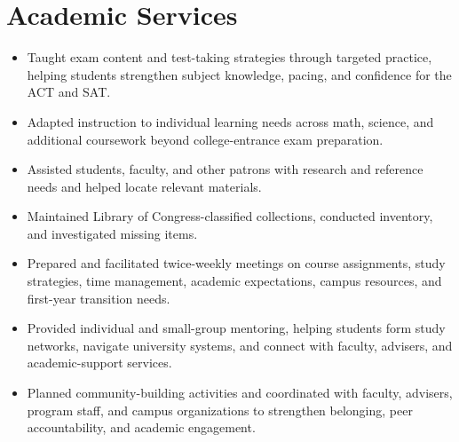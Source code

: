 \section{Academic Services}
\label{sec:academic_services}

\begin{itemize}
  \item Taught exam content and test-taking strategies through targeted practice, helping students strengthen subject knowledge, pacing, and confidence for the ACT and SAT.
  \item Adapted instruction to individual learning needs across math, science, and additional coursework beyond college-entrance exam preparation.
\end{itemize}

\begin{itemize}
  \item Assisted students, faculty, and other patrons with research and reference needs and helped locate relevant materials.
  \item Maintained Library of Congress-classified collections, conducted inventory, and investigated missing items.
\end{itemize}

\begin{itemize}
  \item Prepared and facilitated twice-weekly meetings on course assignments, study strategies, time management, academic expectations, campus resources, and first-year transition needs.
  \item Provided individual and small-group mentoring, helping students form study networks, navigate university systems, and connect with faculty, advisers, and academic-support services.
  \item Planned community-building activities and coordinated with faculty, advisers, program staff, and campus organizations to strengthen belonging, peer accountability, and academic engagement.
\end{itemize}

